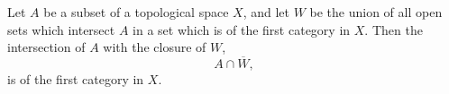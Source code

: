 Let $A$ be a subset of a topological space $X$, and let $W$ be the union of all open sets which intersect $A$ in a set which is of the first category in $X$. Then the intersection of $A$ with the closure of $W$,
\[
A \cap \overline{W},
\]
is of the first category in $X$.
